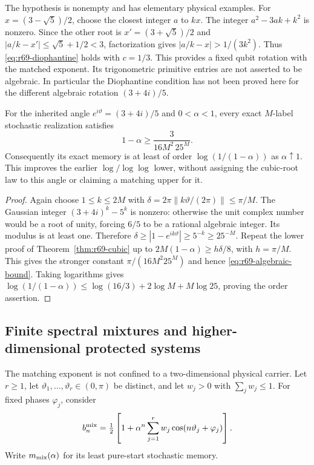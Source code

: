The hypothesis is nonempty and has elementary physical examples. For
$x=(3-\sqrt5)/2$, choose the closest integer $a$ to $kx$. The integer
$a^2-3ak+k^2$ is nonzero. Since the other root is $x'=(3+\sqrt5)/2$ and
$|a/k-x'|\le\sqrt5+1/2<3$, factorization gives
$|a/k-x|>1/(3k^2)$. Thus \eqref{eq:r69-diophantine} holds with $c=1/3$. This provides a fixed qubit rotation with the matched exponent. Its trigonometric primitive entries are not asserted to be algebraic. In particular the Diophantine condition has not been proved here for the different algebraic rotation $(3+4i)/5$.

\begin{corollary}\label{cor:r69-algebraic-angle}
For the inherited angle $e^{i\vartheta}=(3+4i)/5$ and $0<\alpha<1$, every exact $M$-label stochastic realization satisfies
\begin{equation}\label{eq:r69-algebraic-bound}
 1-\alpha\ge\frac3{16M^2\,25^M}.
\end{equation}
Consequently its exact memory is at least of order $\log(1/(1-\alpha))$ as $\alpha\uparrow1$. This improves the earlier $\log/\log\log$ lower, without assigning the cubic-root law to this angle or claiming a matching upper for it.
\end{corollary}
\begin{proof}
Again choose $1\le k\le2M$ with $\delta=2\pi\|k\vartheta/(2\pi)\|\le\pi/M$. The Gaussian integer $(3+4i)^k-5^k$ is nonzero: otherwise the unit complex number would be a root of unity, forcing $6/5$ to be a rational algebraic integer. Its modulus is at least one. Therefore
$\delta\ge|1-e^{ik\vartheta}|\ge5^{-k}\ge25^{-M}$.
Repeat the lower proof of Theorem~\ref{thm:r69-cubic} up to $2M(1-\alpha)\ge h\delta/8$, with $h=\pi/M$. This gives the stronger constant $\pi/(16M^2 25^M)$ and hence \eqref{eq:r69-algebraic-bound}. Taking logarithms gives
$\log(1/(1-\alpha))\le\log(16/3)+2\log M+M\log25$, proving the order assertion.
\end{proof}

\subsection{Finite spectral mixtures and higher-dimensional protected systems}
The matching exponent is not confined to a two-dimensional physical carrier. Let $r\ge1$, let $\vartheta_1,\ldots,\vartheta_r\in(0,\pi)$ be distinct, and let $w_j>0$ with $\sum_jw_j\le1$. For fixed phases $\varphi_j$, consider
\begin{equation}\label{eq:r69-mixture}
 b_n^{\rm mix}=\tfrac12\left[1+\alpha^n
             \sum_{j=1}^r w_j\cos(n\vartheta_j+\varphi_j)\right].
\end{equation}
Write $m_{\rm mix}(\alpha)$ for its least pure-start stochastic memory.

